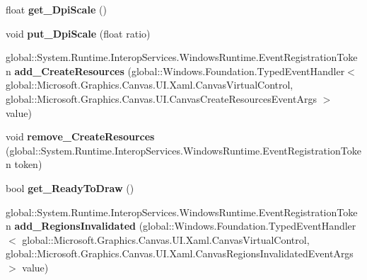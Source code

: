 \begin{DoxyCompactItemize}
float {\bfseries get\+\_\+\+Dpi\+Scale} ()
\item 
\mbox{\label{interface_microsoft_1_1_graphics_1_1_canvas_1_1_u_i_1_1_xaml_1_1_i_canvas_virtual_control_a41445930b2afc9f40e2817d563c3b188}} 
void {\bfseries put\+\_\+\+Dpi\+Scale} (float ratio)
\item 
\mbox{\label{interface_microsoft_1_1_graphics_1_1_canvas_1_1_u_i_1_1_xaml_1_1_i_canvas_virtual_control_a07dc4062e5aad8e7a25c912a888eb205}} 
global\+::\+System.\+Runtime.\+Interop\+Services.\+Windows\+Runtime.\+Event\+Registration\+Token {\bfseries add\+\_\+\+Create\+Resources} (global\+::\+Windows.\+Foundation.\+Typed\+Event\+Handler$<$ global\+::\+Microsoft.\+Graphics.\+Canvas.\+U\+I.\+Xaml.\+Canvas\+Virtual\+Control, global\+::\+Microsoft.\+Graphics.\+Canvas.\+U\+I.\+Canvas\+Create\+Resources\+Event\+Args $>$ value)
\item 
\mbox{\label{interface_microsoft_1_1_graphics_1_1_canvas_1_1_u_i_1_1_xaml_1_1_i_canvas_virtual_control_af71d0732162524cbb84e8775794f761d}} 
void {\bfseries remove\+\_\+\+Create\+Resources} (global\+::\+System.\+Runtime.\+Interop\+Services.\+Windows\+Runtime.\+Event\+Registration\+Token token)
\item 
\mbox{\label{interface_microsoft_1_1_graphics_1_1_canvas_1_1_u_i_1_1_xaml_1_1_i_canvas_virtual_control_ad0524adf9910c3dfd2d10699b71f28d0}} 
bool {\bfseries get\+\_\+\+Ready\+To\+Draw} ()
\item 
\mbox{\label{interface_microsoft_1_1_graphics_1_1_canvas_1_1_u_i_1_1_xaml_1_1_i_canvas_virtual_control_a7d37fb0b34072ecd8bc9f32712ea4cba}} 
global\+::\+System.\+Runtime.\+Interop\+Services.\+Windows\+Runtime.\+Event\+Registration\+Token {\bfseries add\+\_\+\+Regions\+Invalidated} (global\+::\+Windows.\+Foundation.\+Typed\+Event\+Handler$<$ global\+::\+Microsoft.\+Graphics.\+Canvas.\+U\+I.\+Xaml.\+Canvas\+Virtual\+Control, global\+::\+Microsoft.\+Graphics.\+Canvas.\+U\+I.\+Xaml.\+Canvas\+Regions\+Invalidated\+Event\+Args $>$ value)

\end{DoxyCompactItemize}
